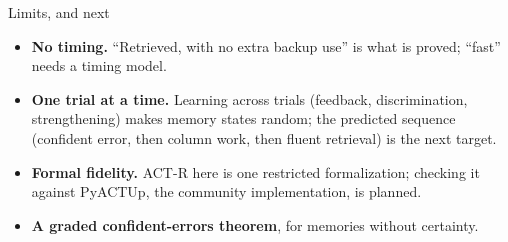 \documentclass[aspectratio=169,11pt]{beamer}
\begin{document}
\begin{frame}{Limits, and next}
  \begin{itemize}
    \item \textbf{No timing.} ``Retrieved, with no extra backup use'' is what is proved; ``fast'' needs a timing model.
    \item \textbf{One trial at a time.} Learning across trials (feedback, discrimination, strengthening) makes memory states random; the predicted sequence (confident error, then column work, then fluent retrieval) is the next target.
    \item \textbf{Formal fidelity.} ACT-R here is one restricted formalization; checking it against PyACTUp, the community implementation, is planned.
    \item \textbf{A graded confident-errors theorem}, for memories without certainty.
  \end{itemize}
\end{frame}
\end{document}
